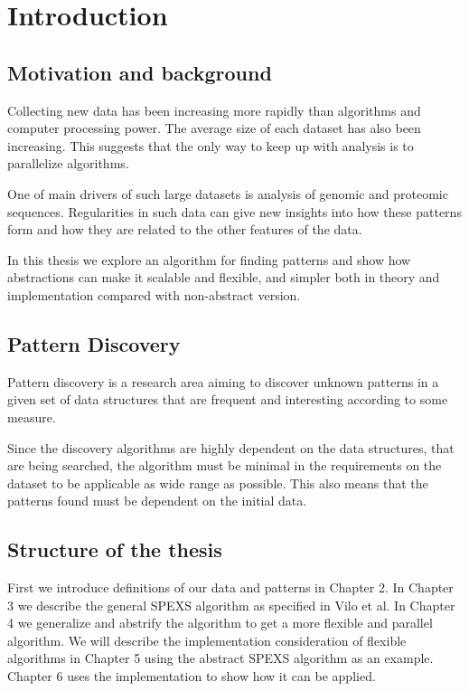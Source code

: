 \chapter{Introduction}

\section{Motivation and background}

Collecting new data has been increasing more rapidly than algorithms and
computer processing power. The average size of each dataset has also
been increasing. This suggests that the only way to keep up with
analysis is to parallelize algorithms.

One of main drivers of such large datasets is analysis
of genomic and proteomic sequences. Regularities in such data can 
give new insights into how these patterns form and how 
they are related to the other features of the data.


In this thesis we explore an algorithm for finding patterns and show how
abstractions can make it scalable and flexible, and simpler both in 
theory and implementation compared with non-abstract version.

\section{Pattern Discovery}

Pattern discovery is a research area aiming to discover unknown patterns
in a given set of data structures that are frequent and interesting according 
to some measure.

Since the discovery algorithms are highly dependent on the
data structures, that are being searched, the algorithm must be minimal
in the requirements on the dataset to be applicable as wide range as possible.
This also means that the patterns found must be dependent on the initial data.

\section{Structure of the thesis}


First we introduce definitions of our data and patterns in Chapter 2. In
Chapter 3 we describe the general SPEXS algorithm as specified in Vilo et al.
In Chapter 4 we generalize and abstrify the algorithm to get a more flexible
and parallel algorithm. We will describe the implementation consideration of
flexible algorithms in Chapter 5 using the abstract SPEXS algorithm as an
example. Chapter 6 uses the implementation to show how it can be applied.